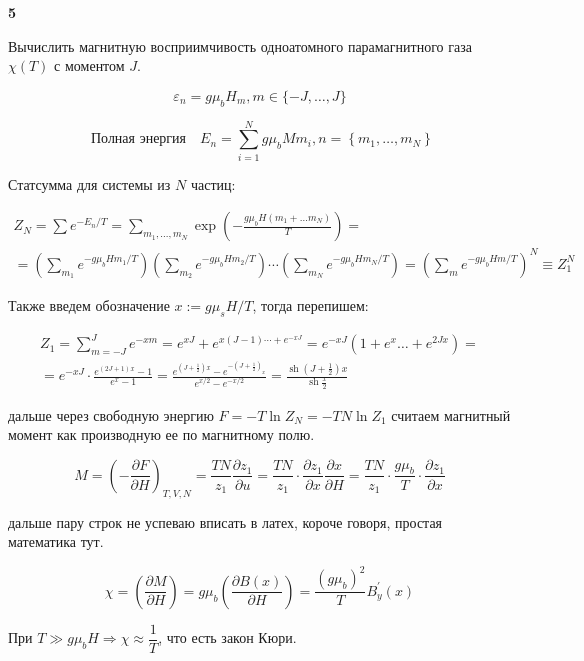 \documentclass[a4paper,12pt]{article} %
\begin{document}
\begin{ttask} \textbf{5}

Вычислить магнитную восприимчивость одноатомного парамагнитного газа $ \chi(T) $ с моментом $ J $.



\[ \varepsilon_{n}=g \mu_{b} H_m, m \in\{-J, \ldots, J\} \]


\[ 	\text { Полная энергия} \quad E_{n}=\sum_{i=1}^{N} g \mu_{b} M m_{i}, n=\left\{m_{1}, \ldots, m_{N}\right\} \]


Статсумма для системы из $N$ частиц:

\begin{multline}
Z_N=\sum e^{-E_n/T} =\sum_{m_1, ..., m_N} \exp \left(-\frac{g\mu_b H (m_1+\ldots m_N)}{T} \right) =
\\
=\left(\sum_{m_1} e^{-g\mu_b Hm_1/T}\right) \left(\sum_{m_2} e^{-g\mu_b Hm_2/T}\right) \cdots \left(\sum_{m_N} e^{-g\mu_b Hm_N/T}\right)=
\left(\sum_{m} e^{-g\mu_b Hm/T}\right)^N\equiv Z_1^N
\end{multline}


Также введем обозначение $ x:=g \mu_s H/T $, тогда перепишем:

\begin{multline}
Z_{1}=\sum_{m=-J}^{J} e^{-x m}=e^{x J}+e^{x(J-1) \cdots+e^{-x J}}=
e^{-xJ}\left(1+e^{x} \ldots+e^{2 Jx}\right)=\\
=e^{-xJ} \cdot \frac{e^{(2 J+1) x}-1}{e^{x}-1}= \frac{e^{\left(J+\frac{1}{2}\right) x}-e^{-\left(J+\frac{1}{2}\right)_{x}}}{e^{x / 2}-e^{-x / 2}}=
\frac{\operatorname{sh}\left(J+\frac{1}{2}\right) x}{\operatorname{sh} \frac{x}{2}}
\end{multline}


дальше через свободную энергию $ F=-T\ln Z_N =-TN\ln Z_1$ считаем магнитный момент как производную ее по магнитному полю.


\[ M=\left(-\frac{\partial F}{\partial H}\right)_{T, V, N}=\frac{T N}{z_{1}} \frac{\partial z_{1}}{\partial u}=\frac{T N}{z_{1}} \cdot \frac{\partial z_{1}}{\partial x} \frac{\partial x}{\partial H}=
\frac{T N}{z_{1}} \cdot \frac{g \mu_{b}}{T} \cdot \frac{\partial z_{1}}{\partial x} \]

дальше пару строк не успеваю вписать в латех, короче говоря, простая математика тут.


\[ \chi=\left(\frac{\partial M}{\partial H}\right)= g \mu_b \left(\frac{\partial B(x)}{\partial H}\right) =\frac{(g\mu_b)^2}{T}B^{\prime}_y(x)\]

При $ T\gg g \mu_b H \Rightarrow\chi \approx \dfrac{1}{T}$, что есть закон Кюри.



\end{ttask}
\end{document}
